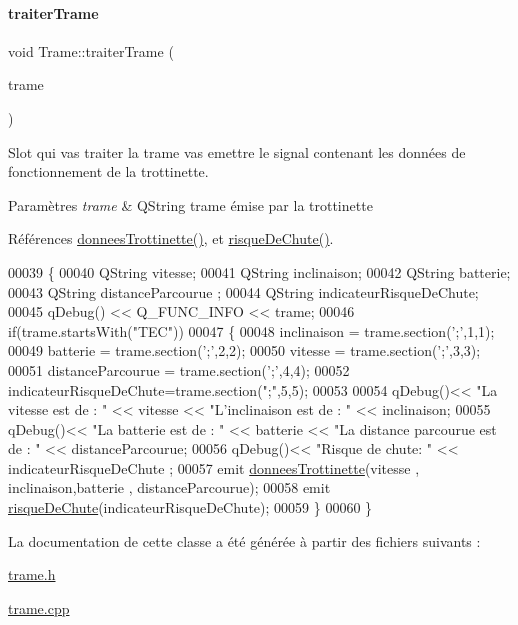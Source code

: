 \paragraph{\texorpdfstring{traiter\+Trame}{traiterTrame}}
{\footnotesize\ttfamily void Trame\+::traiter\+Trame (\begin{DoxyParamCaption}\item[{Q\+String}]{trame }\end{DoxyParamCaption})\hspace{0.3cm}{\ttfamily [slot]}}

Slot qui vas traiter la trame vas emettre le signal contenant les données de fonctionnement de la trottinette.


\begin{DoxyParams}{Paramètres}
{\em trame} & Q\+String trame émise par la trottinette \\
\hline
\end{DoxyParams}


Références \hyperlink{class_trame_ae7f5191744273a6bb4347aa477bdfaff}{donnees\+Trottinette()}, et \hyperlink{class_trame_a8286aea8fb78e2e148f3f0dc35e8b079}{risque\+De\+Chute()}.


\begin{DoxyCode}
00039 \{
00040     QString vitesse;
00041     QString inclinaison;
00042     QString batterie;
00043     QString distanceParcourue ;
00044     QString indicateurRisqueDeChute;
00045     qDebug() << Q\_FUNC\_INFO << trame;
00046     \textcolor{keywordflow}{if}(trame.startsWith(\textcolor{stringliteral}{"TEC"}))
00047     \{
00048         inclinaison = trame.section(\textcolor{charliteral}{';'},1,1);
00049         batterie = trame.section(\textcolor{charliteral}{';'},2,2);
00050         vitesse = trame.section(\textcolor{charliteral}{';'},3,3);
00051         distanceParcourue = trame.section(\textcolor{charliteral}{';'},4,4);
00052         indicateurRisqueDeChute=trame.section(\textcolor{stringliteral}{";"},5,5);
00053 
00054         qDebug()<< \textcolor{stringliteral}{"La vitesse est de : "} << vitesse << \textcolor{stringliteral}{"L'inclinaison est de : "} << inclinaison;
00055         qDebug()<< \textcolor{stringliteral}{"La batterie est de : "} << batterie << \textcolor{stringliteral}{"La distance parcourue est de : "} << 
      distanceParcourue;
00056         qDebug()<< \textcolor{stringliteral}{"Risque de chute: "} << indicateurRisqueDeChute ;
00057         emit \hyperlink{class_trame_ae7f5191744273a6bb4347aa477bdfaff}{donneesTrottinette}(vitesse , inclinaison,batterie , distanceParcourue);
00058         emit \hyperlink{class_trame_a8286aea8fb78e2e148f3f0dc35e8b079}{risqueDeChute}(indicateurRisqueDeChute);
00059     \}
00060 \}
\end{DoxyCode}


La documentation de cette classe a été générée à partir des fichiers suivants \+:\begin{DoxyCompactItemize}
\item 
\hyperlink{trame_8h}{trame.\+h}\item 
\hyperlink{trame_8cpp}{trame.\+cpp}\end{DoxyCompactItemize}
